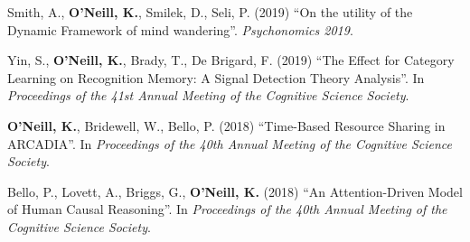 Smith, A., \textbf{O'Neill, K.}, Smilek, D., Seli, P. (2019) ``On the
utility of the Dynamic Framework of mind
wandering''. \emph{Psychonomics 2019}.

Yin, S., \textbf{O'Neill, K.}, Brady, T., De Brigard, F. (2019) ``The
Effect for Category Learning on Recognition Memory: A Signal Detection
Theory Analysis''. In \emph{Proceedings of the 41st Annual Meeting of
  the Cognitive Science Society}.

\textbf{O'Neill, K.}, Bridewell, W., Bello, P. (2018) ``Time-Based
Resource Sharing in ARCADIA''. In \emph{Proceedings of the 40th Annual
  Meeting of the Cognitive Science Society}.

Bello, P., Lovett, A., Briggs, G., \textbf{O'Neill, K.} (2018) ``An
Attention-Driven Model of Human Causal Reasoning''. In
\emph{Proceedings of the 40th Annual Meeting of the Cognitive Science
  Society}.
